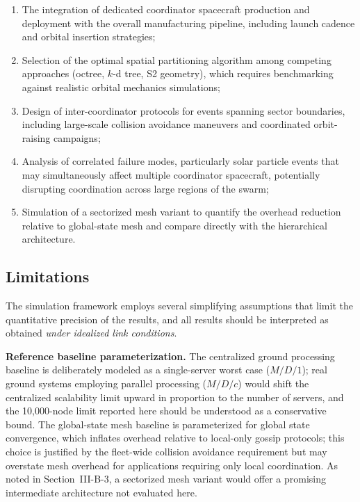 \documentclass[journal]{IEEEtran}
\begin{document}
\begin{enumerate}
    \item The integration of dedicated coordinator spacecraft production and deployment with the overall manufacturing pipeline, including launch cadence and orbital insertion strategies;
    \item Selection of the optimal spatial partitioning algorithm among competing approaches (octree, $k$-d tree, S2 geometry), which requires benchmarking against realistic orbital mechanics simulations;
    \item Design of inter-coordinator protocols for events spanning sector boundaries, including large-scale collision avoidance maneuvers and coordinated orbit-raising campaigns;
    \item Analysis of correlated failure modes, particularly solar particle events that may simultaneously affect multiple coordinator spacecraft, potentially disrupting coordination across large regions of the swarm;
    \item Simulation of a sectorized mesh variant to quantify the overhead reduction relative to global-state mesh and compare directly with the hierarchical architecture.
\end{enumerate}

\subsection{Limitations}

The simulation framework employs several simplifying assumptions that limit the quantitative precision of the results, and all results should be interpreted as obtained \emph{under idealized link conditions}.

\textbf{Reference baseline parameterization.} The centralized ground processing baseline is deliberately modeled as a single-server worst case ($M/D/1$); real ground systems employing parallel processing ($M/D/c$) would shift the centralized scalability limit upward in proportion to the number of servers, and the 10{,}000-node limit reported here should be understood as a conservative bound. The global-state mesh baseline is parameterized for global state convergence, which inflates overhead relative to local-only gossip protocols; this choice is justified by the fleet-wide collision avoidance requirement but may overstate mesh overhead for applications requiring only local coordination. As noted in Section~III-B-3, a sectorized mesh variant would offer a promising intermediate architecture not evaluated here.
\end{document}

